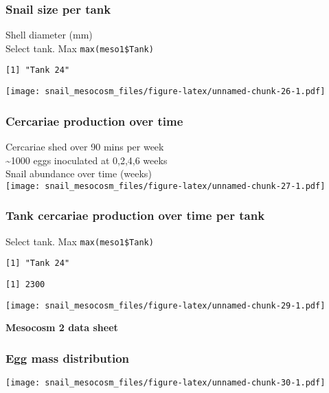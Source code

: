 \documentclass[10,portrait]{article}
\begin{document}
\subsubsection{Snail size per tank}\label{snail-size-per-tank-1}

Shell diameter (mm)\\
Select tank. Max \texttt{max(meso1\$Tank)}

\begin{verbatim}
[1] "Tank 24"
\end{verbatim}

\texttt{[image: snail\_mesocosm\_files/figure-latex/unnamed-chunk-26-1.pdf]}

\subsubsection{Cercariae production over
time}\label{cercariae-production-over-time}

Cercariae shed over 90 mins per week\\
\textasciitilde{}1000 eggs inoculated at 0,2,4,6 weeks\\
Snail abundance over time (weeks)\\
\texttt{[image: snail\_mesocosm\_files/figure-latex/unnamed-chunk-27-1.pdf]}

\subsubsection{Tank cercariae production over time per
tank}\label{tank-cercariae-production-over-time-per-tank}

Select tank. Max \texttt{max(meso1\$Tank)}

\begin{verbatim}
[1] "Tank 24"
\end{verbatim}

\begin{verbatim}
[1] 2300
\end{verbatim}

\texttt{[image: snail\_mesocosm\_files/figure-latex/unnamed-chunk-29-1.pdf]}

\newpage    

\textbf{Mesocosm 2 data sheet}

\subsubsection{Egg mass distribution}\label{egg-mass-distribution}

\texttt{[image: snail\_mesocosm\_files/figure-latex/unnamed-chunk-30-1.pdf]}
\end{document}
